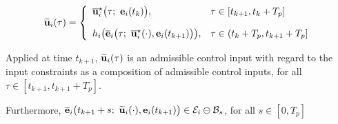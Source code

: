 \begin{equation}
  \widetilde{\vect{u}}_i(\tau) = \left\{
      \begin{array}{ll}
        \overline{\vect{u}}_i^{\star}\big(\tau;\ \vect{e}_i(t_k)\big), & \tau \in [t_{k+1}, t_k + T_p] \\[2.5ex]
        h_i\big(\overline{\vect{e}}_i\big(\tau;\ \overline{\vect{u}}_i^{\star}(\cdot), \vect{e}_i(t_{k+1})\big)\big), & \tau \in (t_k + T_p, t_{k+1} + T_p]
      \end{array}
      \right.
\label{eq:optimal_input_t_plus_one}
\end{equation}

Applied at time $t_{k+1}$, $\widetilde{\bm{\mathbf{u}}}_i(\tau)$
is an admissible control input with regard to the input constraints as
a composition of admissible control inputs, for
all $\tau \in [t_{k+1}, t_{k+1} + T_p]$.


Furthermore, $\overline{\vect{e}}_i\big(t_{k+1} + s;\ \widetilde{\vect{u}}_i(\cdot), \vect{e}_i(t_{k+1})\big) \in \mathcal{E}_i \ominus \mathcal{B}_{s}$,
for all $s \in [0, T_p]$


